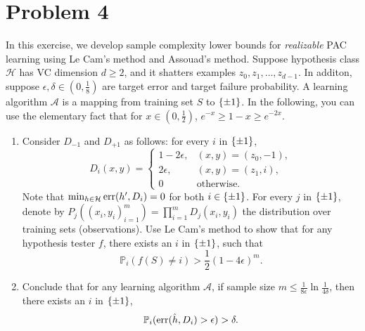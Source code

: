 \documentclass{article}
\DeclareMathOperator*{\err}{{\rm err}}
\DeclareMathOperator*{\U}{{\rm U}}
\newcommand{\PP}{\mathbb{P}} %
\newcommand{\Acal}{\mathcal{A}} %
\newcommand{\Hcal}{\mathcal{H}} %
\begin{document}
\section*{Problem 4}
In this exercise, we develop sample complexity lower bounds for {\em realizable} PAC learning using Le Cam's method and Assouad's method. Suppose hypothesis class $\Hcal$ has VC dimension $d \geq 2$, and it shatters examples $z_0, z_1, \ldots, z_{d-1}$. In additon, suppose $\epsilon, \delta \in (0,\frac18)$ are target error and target failure probability.
A learning algorithm $\Acal$ is a mapping from training set $S$ to $\cbr{\pm 1}$.
In the following, you can use the elementary fact that for $x \in (0,\frac12)$, $e^{-x} \geq 1-x \geq e^{-2x}$.


\begin{enumerate}
\item Consider $D_{-1}$ and $D_{+1}$ as follows: for every $i$ in $\cbr{\pm 1}$,
\[ D_{i}(x,y) = \begin{cases} 1-2\epsilon, & (x,y) = (z_0, -1), \\
                                2\epsilon, & (x,y) = (z_1, i), \\
                                0 & \text{otherwise.} \end{cases}  \]
Note that $\min_{h \in \Hcal} \err(h', D_i) = 0$ for both $i \in \cbr{\pm 1}$.
For every $j$ in $\cbr{\pm 1}$, denote by $P_{j}((x_i,y_i)_{i=1}^m) = \prod_{i=1}^m D_{j}(x_i, y_i)$ the distribution over training sets (observations).
Use Le Cam's method to show that for any hypothesis tester $f$, there exists an $i$
in $\cbr{\pm 1}$, such that
\[ \PP_i( f(S) \neq i ) > \frac12 (1-4\epsilon)^m. \]



\item Conclude that for any learning algorithm $\Acal$, if sample size $m \leq \frac{1}{8\epsilon}\ln\frac1{4\delta}$, then there exists an $i$ in $\cbr{\pm 1}$,
\[ \PP_i( \err(\hat{h}, D_i) > \epsilon) > \delta. \]


\end{enumerate}
\end{document}
